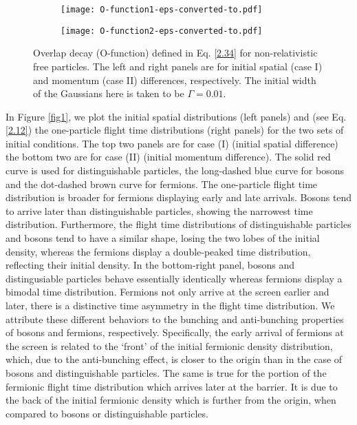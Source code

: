 \documentclass[preprint,aps]{revtex4}
\begin{document}
%
\begin{figure}
	\begin{subfigure}[t]{0.45\textwidth}
		\texttt{[image: O-function1-eps-converted-to.pdf]}
		\label{fig2a}
	\end{subfigure}
	\hfill
	\begin{subfigure}[t]{0.45\textwidth}
		\texttt{[image: O-function2-eps-converted-to.pdf]}
		\label{fig2b}
	\end{subfigure}
	
	
	\caption{Overlap decay (O-function) defined in Eq. \ref{2.34} for non-relativistic free particles. The left and right panels are for initial spatial (case I) and momentum (case II) differences, respectively. The initial width of the Gaussians here is taken to be $\Gamma=0.01$. } \label{fig2}
\end{figure} 


In Figure \ref{fig1}, we plot the initial spatial  distributions (left panels) and (see Eq. \ref{2.12}) the one-particle flight time distributions (right panels) for the two sets of initial conditions. The top two panels are for case (I) (initial spatial difference) the bottom two are for case  (II) (initial momentum difference).
The solid red curve is used for distinguishable particles,   the
long-dashed blue curve for bosons and the dot-dashed brown curve for fermions. The one-particle flight time distribution is broader for fermions displaying early and late arrivals. Bosons tend to arrive later than distinguishable particles, showing the narrowest time distribution.
Furthermore, the flight time distributions of distinguishable particles
and bosons tend to have a similar shape, losing the two lobes of the initial density, whereas 
the fermions display a double-peaked time distribution, reflecting their initial
density. In the bottom-right panel, bosons and distingusiable particles behave essentially identically
whereas fermions display a bimodal time distribution. Fermions not only arrive at the screen earlier and later, there is a distinctive time asymmetry 
in the flight time distribution.
We attribute these different behaviors to the bunching and anti-bunching properties of bosons and fermions, respectively. Specifically, the early arrival of fermions at the screen is related to the `front' of the initial fermionic density distribution, which, due to the anti-bunching effect, is closer to the origin than in the case of bosons and distinguishable particles. The same is true for the portion of the fermionic flight time distribution which arrives later at the barrier. It is due to the back of the initial fermionic density which is further from the origin, when compared to bosons or distinguishable particles.
\end{document}
